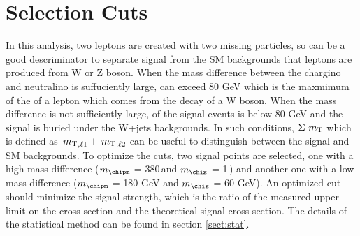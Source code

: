 \section{Selection Cuts}
\label{sect:cuts}
In this analysis, two leptons are created with two missing particles, so \mttwo can be a good descriminator to separate signal 
from the SM backgrounds that leptons are produced from W or Z boson. When the mass difference between the chargino and neutralino 
is suffuciently large, \mttwo can exceed 80 GeV which is the maxmimum of the \mt of a lepton which comes from the decay of a W boson.
When the mass difference is not sufficiently large, \mttwo of the signal events is below 80 GeV and the signal is buried under the W+jets
backgrounds. In such conditions, $\Sigma\,\,{m_{\rm T}}$ which is defined as $\,{m_{\rm T}}_{,\ell1} + \,{m_{\rm T}}_{,\ell2}$ can be useful to distinguish between the signal and 
SM backgrounds.
To optimize the cuts, two signal points are selected, one with a high mass difference ($m_{\chipm}$ = 380\,\GeV and $m_{\chiz}$ = 1\,\GeV) and
another one with a low mass difference ($m_{\chipm}$ = 180 GeV and $m_{\chiz}$ = 60 GeV). An optimized cut should minimize the signal strength, 
which is the ratio of the measured upper limit on the cross section and the theoretical signal cross section. The details of the statistical 
method can be found in section \ref{sect:stat}.



